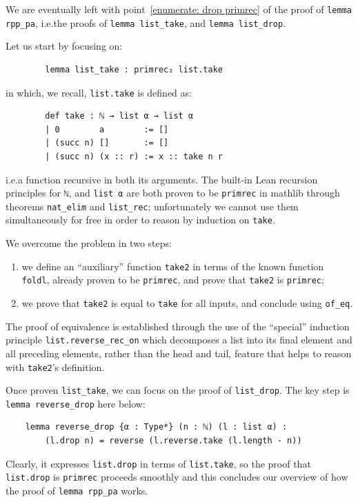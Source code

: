 \documentclass[preprint]{elsarticle}
\theoremstyle{remark}
\newcommand{\MATHLIB}{\textsf{mathlib}\xspace}
\newcommand{\LEAN}{\textsf{Lean}\xspace}
\begin{document}
We are eventually left with point~\ref{enumerate: drop primrec} of the proof of \lstinline|lemma rpp_pa|, i.e.\@ the proofs of \lstinline|lemma list_take|, and \lstinline|lemma list_drop|.

\vspace{\baselineskip}
\noindent
Let us start by focusing on:
\begin{lstlisting}
        lemma list_take : primrec₂ list.take
\end{lstlisting}
\noindent
in which, we recall, \lstinline|list.take| is defined as:
\begin{lstlisting}
        def take : ℕ → list α → list α
        | 0        a        := []
        | (succ n) []       := []
        | (succ n) (x :: r) := x :: take n r
\end{lstlisting}
\noindent
i.e.\@ a function recursive in both its arguments. The built-in \LEAN recursion principles for \lstinline|ℕ|, and \lstinline|list α| are both proven to be \lstinline|primrec| in \MATHLIB through theorems \lstinline|nat_elim| and \lstinline|list_rec|; unfortunately we cannot use them simultaneously for free in order to reason by induction on \lstinline|take|.

\vspace{\baselineskip}
\noindent
We overcome the problem in two steps:
\begin{enumerate}
    \item we define an ``auxiliary'' function \lstinline|take2| in terms of the known function \lstinline|foldl|, already proven to be \lstinline|primrec|, and prove that \lstinline|take2| is \lstinline|primrec|;
    \item we prove that \lstinline|take2| is equal to \lstinline|take| for all inputs, and conclude using \lstinline|of_eq|.
\end{enumerate}
The proof of equivalence is established through the use of the ``special'' induction principle \lstinline|list.reverse_rec_on| which decomposes a list into its final element and all preceding elements, rather than the head and tail, feature that helps to reason with \lstinline|take2|'s definition.

\vspace{\baselineskip}
\noindent
Once proven \lstinline|list_take|, we can focus on the proof of \lstinline|list_drop|.
The key step is \lstinline|lemma reverse_drop| here below:
\begin{lstlisting}
    lemma reverse_drop {α : Type*} (n : ℕ) (l : list α) :
        (l.drop n) = reverse (l.reverse.take (l.length - n))
\end{lstlisting}
\noindent
Clearly, it expresses \lstinline|list.drop| in terms of \lstinline|list.take|, so the proof that \lstinline|list.drop| is \lstinline|primrec| proceeds smoothly and this concludes our overview of how the proof of \lstinline|lemma rpp_pa| works.
\end{document}
